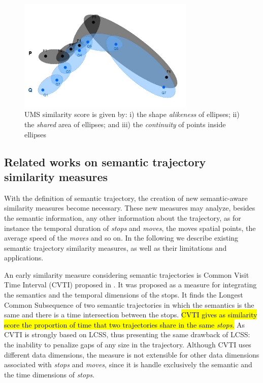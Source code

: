 \begin{figure}[!h]
\centering
\includegraphics[width=0.75\textwidth]{Related_Works/related_trajes-UMS.jpg}
\caption{\label{fig:related_trajes_UMS}UMS similarity score is given by: i) the shape \textit{alikeness} of ellipses; ii) the \textit{shared} area of ellipses; and iii) the \textit{continuity} of points inside ellipses}
\end{figure}

\subsection{Related works on semantic trajectory similarity measures} \label{sec:related_semantic}

With the definition of semantic trajectory, the creation of new semantic-aware similarity measures become necessary. These new measures may analyze, besides the semantic information, any other information about the trajectory, as for instance the temporal duration of \emph{stops} and \emph{moves}, the moves spatial points, the average speed of the \emph{moves} and so on.
In the following we describe existing semantic trajectory similarity measures, as well as their limitations and applications. %

An early similarity measure considering semantic trajectories is Common Visit Time Interval (CVTI) proposed in \cite{Kang:2009:SMT:1529282.1529580}. It was proposed as a measure for integrating the semantics {and the temporal dimensions of the stops}. It finds the Longest Common Subsequence of two semantic trajectories in which the semantics is the same and there is a time intersection between the stops. \hl{CVTI gives as similarity score the proportion of time that two trajectories share in the same \emph{stops}.}
As CVTI is strongly based on LCSS, thus presenting the same drawback of LCSS: the inability to penalize gaps of any size in the trajectory. Although CVTI uses different data dimensions, the measure is not extensible for other data dimensions associated with \emph{stops} and \emph{moves}, since it is handle exclusively the semantic and the time dimensions of \emph{stops}.

